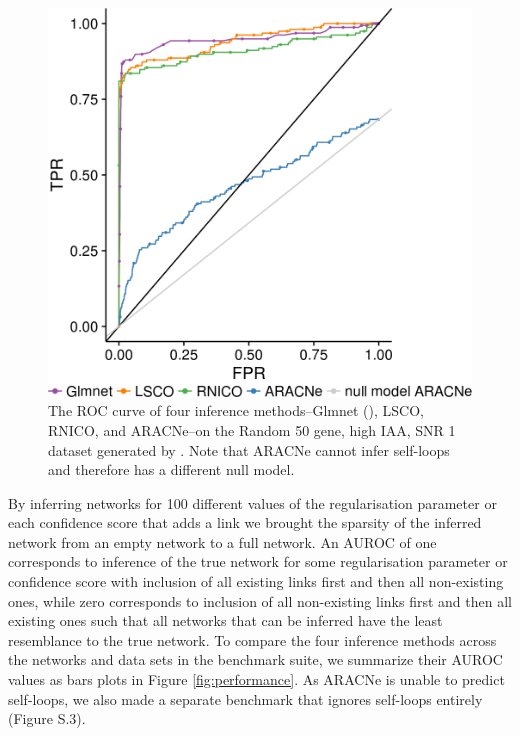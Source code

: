 \begin{figure}[!htb]
\centering
\includegraphics[width=.5\linewidth]{img/ROCcurve.png}
\captionsetup{width=.7\textwidth}
\caption{The ROC curve of four inference methods--Glmnet (\lasso), LSCO, RNICO, and ARACNe--on the Random 50 gene, high IAA, SNR 1 dataset generated by \gs. Note that ARACNe cannot infer self-loops and  therefore has a different null model.}
\label{fig:single_performance}
\end{figure}

By inferring networks for 100 different values of the regularisation parameter or each confidence score that adds a link we brought the sparsity of the inferred network from an empty network to a full network.
An AUROC of one corresponds to inference of the true network for some regularisation parameter or confidence score with inclusion of all existing links first and then all non-existing ones, while zero corresponds to inclusion of all non-existing links first and then all existing ones such that all networks that can be inferred have the least resemblance to the true network.
To compare the four inference methods across the networks and data sets in the benchmark suite, we summarize their AUROC values as bars plots in Figure \ref{fig:performance}. As ARACNe is unable to predict self-loops, we also made a separate benchmark that ignores self-loops entirely (Figure S.3).%

